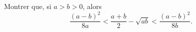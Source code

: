 Montrer que, si $a > b > 0$, alors
\[ \frac{(a - b)^2}{8a} < \frac{a + b}{2} - \sqrt{ab} < \frac{(a - b)^2}{8b}. \]

